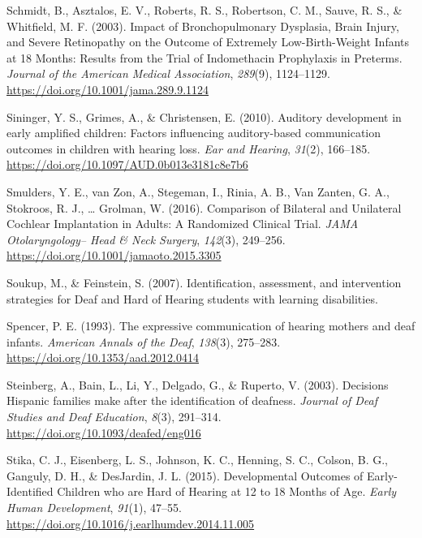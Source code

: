 \documentclass[english,man]{apa6}
\begin{document}
\leavevmode\hypertarget{ref-schmidt2003}{}%
Schmidt, B., Asztalos, E. V., Roberts, R. S., Robertson, C. M., Sauve, R. S., \& Whitfield, M. F. (2003). Impact of Bronchopulmonary Dysplasia, Brain Injury, and Severe Retinopathy on the Outcome of Extremely Low-Birth-Weight Infants at 18 Months: Results from the Trial of Indomethacin Prophylaxis in Preterms. \emph{Journal of the American Medical Association}, \emph{289}(9), 1124--1129. \url{https://doi.org/10.1001/jama.289.9.1124}

\leavevmode\hypertarget{ref-sininger2010}{}%
Sininger, Y. S., Grimes, A., \& Christensen, E. (2010). Auditory development in early amplified children: Factors influencing auditory-based communication outcomes in children with hearing loss. \emph{Ear and Hearing}, \emph{31}(2), 166--185. \url{https://doi.org/10.1097/AUD.0b013e3181c8e7b6}

\leavevmode\hypertarget{ref-smulders2016}{}%
Smulders, Y. E., van Zon, A., Stegeman, I., Rinia, A. B., Van Zanten, G. A., Stokroos, R. J., \ldots{} Grolman, W. (2016). Comparison of Bilateral and Unilateral Cochlear Implantation in Adults: A Randomized Clinical Trial. \emph{JAMA Otolaryngology-- Head \& Neck Surgery}, \emph{142}(3), 249--256. \url{https://doi.org/10.1001/jamaoto.2015.3305}

\leavevmode\hypertarget{ref-soukup2007}{}%
Soukup, M., \& Feinstein, S. (2007). Identification, assessment, and intervention strategies for Deaf and Hard of Hearing students with learning disabilities.

\leavevmode\hypertarget{ref-spencer1993}{}%
Spencer, P. E. (1993). The expressive communication of hearing mothers and deaf infants. \emph{American Annals of the Deaf}, \emph{138}(3), 275--283. \url{https://doi.org/10.1353/aad.2012.0414}

\leavevmode\hypertarget{ref-steinberg2003}{}%
Steinberg, A., Bain, L., Li, Y., Delgado, G., \& Ruperto, V. (2003). Decisions Hispanic families make after the identification of deafness. \emph{Journal of Deaf Studies and Deaf Education}, \emph{8}(3), 291--314. \url{https://doi.org/10.1093/deafed/eng016}

\leavevmode\hypertarget{ref-stika2015}{}%
Stika, C. J., Eisenberg, L. S., Johnson, K. C., Henning, S. C., Colson, B. G., Ganguly, D. H., \& DesJardin, J. L. (2015). Developmental Outcomes of Early-Identified Children who are Hard of Hearing at 12 to 18 Months of Age. \emph{Early Human Development}, \emph{91}(1), 47--55. \url{https://doi.org/10.1016/j.earlhumdev.2014.11.005}
\end{document}
